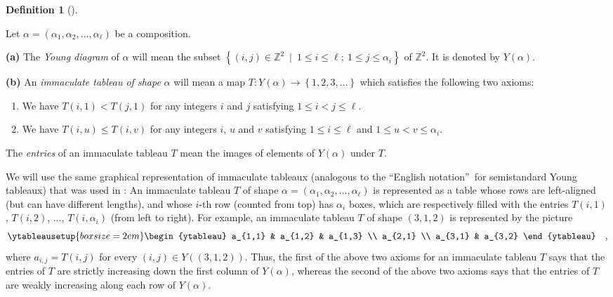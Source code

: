 \documentclass[numbers=enddot,12pt,final,onecolumn,notitlepage,abstracton]{scrartcl}%
\theoremstyle{definition}
\newtheorem{defi}[theo]{Definition}
\newenvironment{definition}[1][]
{\begin{defi}[#1]\begin{leftbar}}
{\end{leftbar}\end{defi}}
\begin{document}
\Needspace{15cm}

\begin{definition}
\label{def.immactab}Let $\alpha=\left(  \alpha_{1},\alpha_{2},\ldots
,\alpha_{\ell}\right)  $ be a composition.

\textbf{(a)} The \textit{Young diagram} of $\alpha$ will mean the subset
$\left\{  \left(  i,j\right)  \in\mathbb{Z}^{2}\ \mid\ 1\leq i\leq\ell;\ 1\leq
j\leq\alpha_{i}\right\}  $ of $\mathbb{Z}^{2}$. It is denoted by $Y\left(
\alpha\right)  $.

\textbf{(b)} An \textit{immaculate tableau of shape }$\alpha$ will mean a map
$T:Y\left(  \alpha\right)  \rightarrow\left\{  1,2,3,\ldots\right\}  $ which
satisfies the following two axioms:

\begin{enumerate}
\item We have $T\left(  i,1\right)  <T\left(  j,1\right)  $ for any integers
$i$ and $j$ satisfying $1\leq i<j\leq\ell$.

\item We have $T\left(  i,u\right)  \leq T\left(  i,v\right)  $ for any
integers $i$, $u$ and $v$ satisfying $1\leq i\leq\ell$ and $1\leq
u<v\leq\alpha_{i}$.
\end{enumerate}

The \textit{entries} of an immaculate tableau $T$ mean the images of elements
of $Y\left(  \alpha\right)  $ under $T$.

We will use the same graphical representation of immaculate tableaux
(analogous to the \textquotedblleft English notation\textquotedblright\ for
semistandard Young tableaux) that was used in \cite{BBSSZ}: An immaculate
tableau $T$ of shape $\alpha=\left(  \alpha_{1},\alpha_{2},\ldots,\alpha
_{\ell}\right)  $ is represented as a table whose rows are left-aligned (but
can have different lengths), and whose $i$-th row (counted from top) has
$\alpha_{i}$ boxes, which are respectively filled with the entries $T\left(
i,1\right)  $, $T\left(  i,2\right)  $, $\ldots$, $T\left(  i,\alpha
_{i}\right)  $ (from left to right). For example, an immaculate tableau $T$ of
shape $\left(  3,1,2\right)  $ is represented by the picture%
\[
\ytableausetup{boxsize=2em} \begin{ytableau}
a_{1,1} & a_{1,2} & a_{1,3} \\
a_{2,1} \\
a_{3,1} & a_{3,2}
\end{ytableau}
\quad,
\]
where $a_{i,j}=T\left(  i,j\right)  $ for every $\left(  i,j\right)  \in
Y\left(  \left(  3,1,2\right)  \right)  $. Thus, the first of the above two
axioms for an immaculate tableau $T$ says that the entries of $T$ are strictly
increasing down the first column of $Y\left(  \alpha\right)  $, whereas the
second of the above two axioms says that the entries of $T$ are weakly
increasing along each row of $Y\left(  \alpha\right)  $.


\end{definition}
\end{document}
